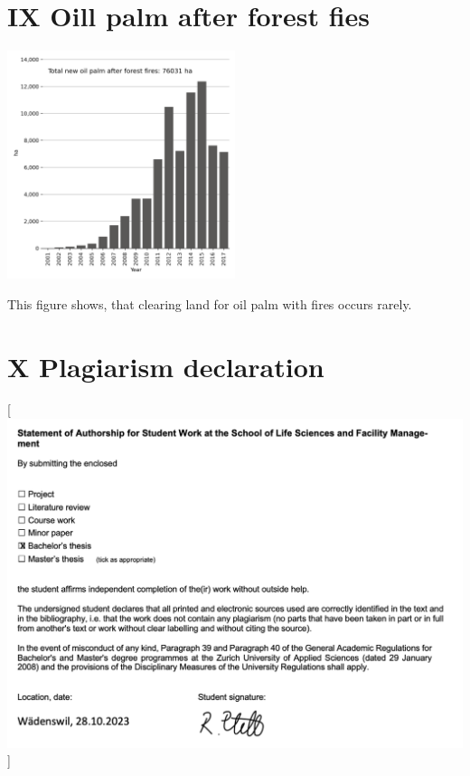 \documentclass[
  letterpaper,
  DIV=11,
  numbers=noendperiod]{scrreprt}
\begin{document}
\newpage

\hypertarget{oill-palm-after-forest-fies}{%
\section*{\texorpdfstring{\textsc{IX} Oill palm after forest
fies}{ Oill palm after forest fies}}\label{oill-palm-after-forest-fies}}


\color{white}

\includegraphics[width=0.5\textwidth,height=\textheight]{text/../code/results/final_plots/new_oil_palm_after_forest_fires.png}
\normalcolor

This figure shows, that clearing land for oil palm with fires occurs
rarely.

\newpage

\hypertarget{sec-annex_x}{%
\section*{\texorpdfstring{\textsc{X} Plagiarism
declaration}{ Plagiarism declaration}}\label{sec-annex_x}}


\color{white}

{[}\includegraphics[width=1\textwidth,height=\textheight]{text/annex_files/plagiarism_declaration.png}{]}
\normalcolor \newpage
\end{document}
